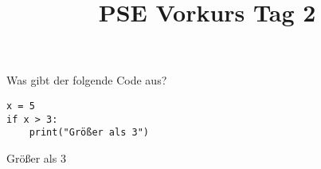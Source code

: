 \documentclass{../../sheet}
\title{PSE Vorkurs Tag 2}
\begin{document}
\maketitle

Was gibt der folgende Code aus?
\begin{verbatim}
x = 5
if x > 3:
    print("Größer als 3")
\end{verbatim}

\begin{ausgabe}
    Größer als 3
\end{ausgabe}

\newpage
{}
\end{document}
